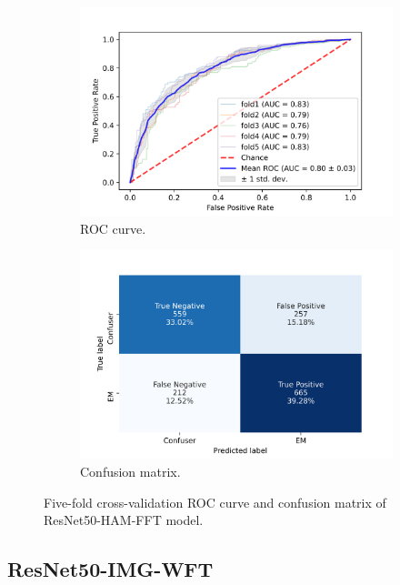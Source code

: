 \begin{figure}[h!]
	\centering
	\begin{subfigure}[b]{0.49\textwidth}
		\centering
		\includegraphics[width=\textwidth,keepaspectratio]{images/Supplement4/image35.png}
		\caption{ROC curve.}
	\end{subfigure}
	\hfill
	\begin{subfigure}[b]{0.49\textwidth}
		\centering
		\includegraphics[width=\textwidth,keepaspectratio]{images/Supplement4/image41.png}
		\caption{Confusion matrix.}
	\end{subfigure}
	\caption{Five-fold cross-validation ROC curve and confusion matrix of ResNet50-HAM-FFT model.}
\end{figure}

\vfill\clearpage
\subsection{ResNet50-IMG-WFT}


